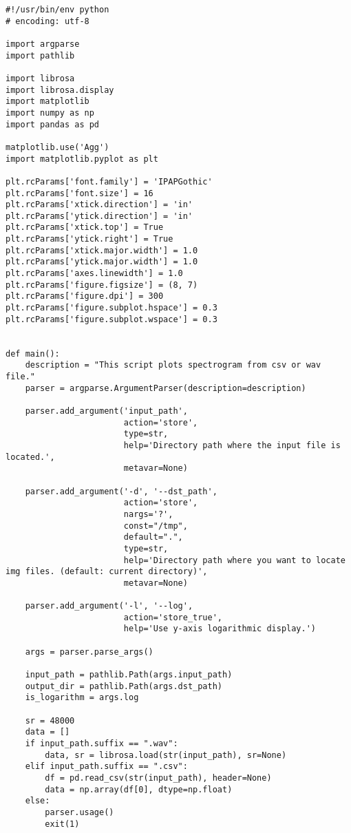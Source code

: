 \begin{lstlisting}[caption=plot\_spectrogram\_librosa.py,label=plot_spectrogram_librosa.py]
#!/usr/bin/env python
# encoding: utf-8

import argparse
import pathlib

import librosa
import librosa.display
import matplotlib
import numpy as np
import pandas as pd

matplotlib.use('Agg')
import matplotlib.pyplot as plt

plt.rcParams['font.family'] = 'IPAPGothic'
plt.rcParams['font.size'] = 16
plt.rcParams['xtick.direction'] = 'in'
plt.rcParams['ytick.direction'] = 'in'
plt.rcParams['xtick.top'] = True
plt.rcParams['ytick.right'] = True
plt.rcParams['xtick.major.width'] = 1.0
plt.rcParams['ytick.major.width'] = 1.0
plt.rcParams['axes.linewidth'] = 1.0
plt.rcParams['figure.figsize'] = (8, 7)
plt.rcParams['figure.dpi'] = 300
plt.rcParams['figure.subplot.hspace'] = 0.3
plt.rcParams['figure.subplot.wspace'] = 0.3


def main():
    description = "This script plots spectrogram from csv or wav file."
    parser = argparse.ArgumentParser(description=description)

    parser.add_argument('input_path',
                        action='store',
                        type=str,
                        help='Directory path where the input file is located.',
                        metavar=None)

    parser.add_argument('-d', '--dst_path',
                        action='store',
                        nargs='?',
                        const="/tmp",
                        default=".",
                        type=str,
                        help='Directory path where you want to locate img files. (default: current directory)',
                        metavar=None)

    parser.add_argument('-l', '--log',
                        action='store_true',
                        help='Use y-axis logarithmic display.')

    args = parser.parse_args()

    input_path = pathlib.Path(args.input_path)
    output_dir = pathlib.Path(args.dst_path)
    is_logarithm = args.log

    sr = 48000
    data = []
    if input_path.suffix == ".wav":
        data, sr = librosa.load(str(input_path), sr=None)
    elif input_path.suffix == ".csv":
        df = pd.read_csv(str(input_path), header=None)
        data = np.array(df[0], dtype=np.float)
    else:
        parser.usage()
        exit(1)


\end{lstlisting}
